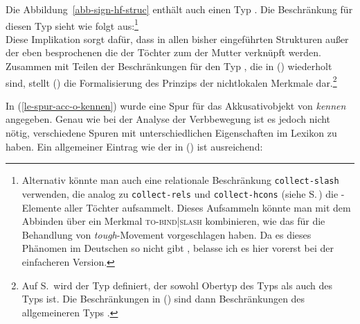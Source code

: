 Die Abbildung~\ref{abb-sign-hf-struc} enthält auch einen Typ . Die Beschränkung
für diesen Typ sieht wie folgt aus:\footnote{%
  Alternativ könnte man auch eine relationale Beschränkung \texttt{collect-slash} verwenden, die
  analog zu \texttt{collect-rels} und \texttt{collect-hcons} (siehe
  S.\,\pageref{constraint-collect-rels-collect-hcons}) die \slasch-Elemente aller Töchter
  aufsammelt. Dieses Aufsammeln könnte man mit dem Abbinden über ein Merkmal \textsc{to-bind|slash}
  kombinieren, wie das \citet[163--164]{ps2} für die Behandlung von \emph{tough}-Movement
  vorgeschlagen haben. Da es dieses Phänomen im Deutschen so nicht gibt \citep[275]{Demske94a},
belasse ich es hier vorerst bei der
  einfacheren Version.
}
\eas
{} \impl\\
\zs
Diese Implikation sorgt dafür, dass in allen bisher eingeführten Strukturen außer der eben besprochenen
die \slashwe der Töchter zum \slashw der Mutter verknüpft werden.
Zusammen mit Teilen der Beschränkungen für den Typ , die in ()
wiederholt sind, stellt () die Formalisierung des Prinzips der nichtlokalen Merkmale
dar.\footnote{%
  Auf S.\,\pageref{type-filler-phrase} wird der Typ  definiert, der sowohl Obertyp des Typs
   als auch des Typs  ist. Die Beschränkungen in
  () sind dann Beschränkungen des allgemeineren Typs .
}
\eas
{} \impl\\
\zs
\largerpage

\noindent
In (\ref{le-spur-acc-o-kennen}) wurde eine Spur für das Akkusativobjekt von \emph{kennen} angegeben.
Genau wie bei der Analyse der Verbbewegung ist es jedoch nicht nötig, verschiedene Spuren mit unterschiedlichen
Eigenschaften im Lexikon zu haben. Ein allgemeiner Eintrag wie der in () ist ausreichend:

